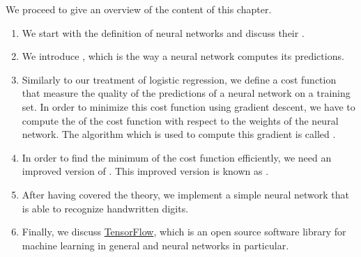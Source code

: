 We proceed to give an overview of the content of this chapter.
\begin{enumerate}
\item We start with the definition of  neural networks and discuss their .
\item We introduce , which is the way a neural network computes its predictions.
\item Similarly to our treatment of logistic regression, we define a cost function that measure the quality of
      the predictions of a neural network on a training set.  In order to minimize this cost function using
      gradient descent, we have to compute the  of the cost function with respect to the weights of the
      neural network.  The algorithm which is used to compute this gradient is called .
\item In order to find the minimum of the cost function efficiently, we need an improved version of
      .  This improved version is known as .
\item After having covered the theory, we implement a simple neural network that is able to recognize
      handwritten digits.
\item Finally, we discuss \href{https://www.tensorflow.org}{TensorFlow}, which is an open source software
      library for machine learning in general and neural networks in particular.
\end{enumerate}

